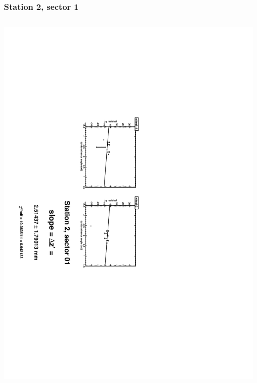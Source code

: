\documentclass[compress]{beamer}
\begin{document}
\begin{frame}
\frametitle{Station 2, sector 1}
\begin{columns}
\includegraphics[height=\linewidth, angle=90]{zfits/zfit_2_01.pdf}


\end{columns}
\end{frame}
\end{document}
